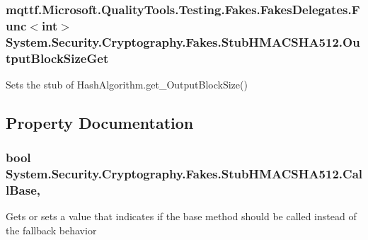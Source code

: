 \hypertarget{class_system_1_1_security_1_1_cryptography_1_1_fakes_1_1_stub_h_m_a_c_s_h_a512_ae26f1285f8d79d204b4b267c902e86f8}{
\subsubsection[{Output\-Block\-Size\-Get}]{\setlength{\rightskip}{0pt plus 5cm}mqttf.\-Microsoft.\-Quality\-Tools.\-Testing.\-Fakes.\-Fakes\-Delegates.\-Func$<$int$>$ System.\-Security.\-Cryptography.\-Fakes.\-Stub\-H\-M\-A\-C\-S\-H\-A512.\-Output\-Block\-Size\-Get}}\label{class_system_1_1_security_1_1_cryptography_1_1_fakes_1_1_stub_h_m_a_c_s_h_a512_ae26f1285f8d79d204b4b267c902e86f8}


Sets the stub of Hash\-Algorithm.\-get\-\_\-\-Output\-Block\-Size()



\subsection{Property Documentation}
\hypertarget{class_system_1_1_security_1_1_cryptography_1_1_fakes_1_1_stub_h_m_a_c_s_h_a512_ae9cb238c6094ba3f2d88b3967532b99d}{
\subsubsection[{Call\-Base}]{\setlength{\rightskip}{0pt plus 5cm}bool System.\-Security.\-Cryptography.\-Fakes.\-Stub\-H\-M\-A\-C\-S\-H\-A512.\-Call\-Base\hspace{0.3cm}{\ttfamily [get]}, {\ttfamily [set]}}}\label{class_system_1_1_security_1_1_cryptography_1_1_fakes_1_1_stub_h_m_a_c_s_h_a512_ae9cb238c6094ba3f2d88b3967532b99d}


Gets or sets a value that indicates if the base method should be called instead of the fallback behavior

